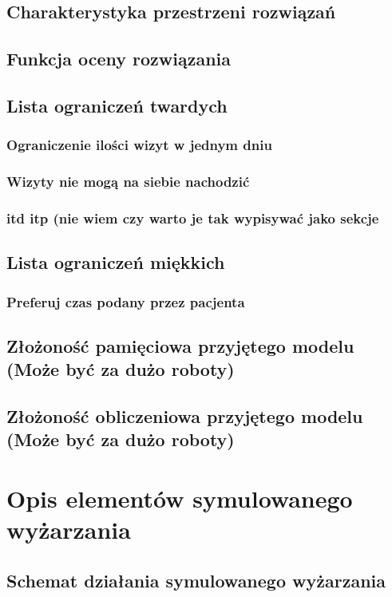 \section{Charakterystyka przestrzeni rozwiązań}
\section{Funkcja oceny rozwiązania}
\section{Lista ograniczeń twardych \label{constraints}}
\subsection{Ograniczenie ilości wizyt w jednym dniu}
\subsection{Wizyty nie mogą na siebie nachodzić}
\subsection{itd itp (nie wiem czy warto je tak wypisywać jako sekcje}
\section{Lista ograniczeń miękkich}
\subsection{Preferuj czas podany przez pacjenta}
\section{Złożoność pamięciowa przyjętego modelu (Może być za dużo roboty)}
\section{Złożoność obliczeniowa przyjętego modelu (Może być za dużo roboty)}

\chapter{Opis elementów symulowanego wyżarzania}

\section{Schemat działania symulowanego wyżarzania}


